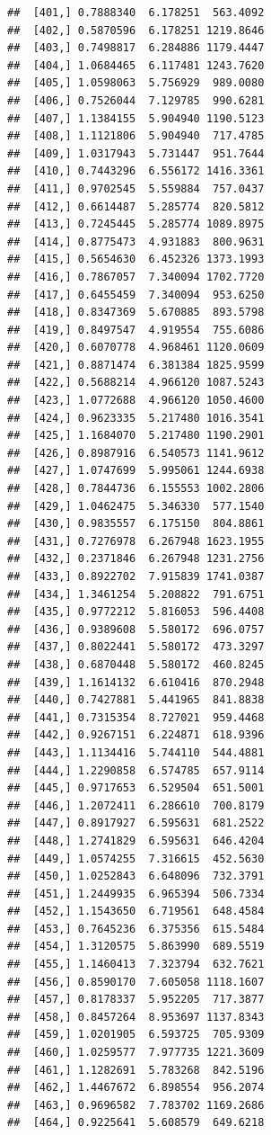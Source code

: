 \documentclass[article]{jss}\usepackage[]{graphicx}\usepackage[]{xcolor}
\makeatletter
\newenvironment{kframe}{%
 \def\at@end@of@kframe{}%
 \ifinner\ifhmode%
  \def\at@end@of@kframe{\end{minipage}}%
  \begin{minipage}{\columnwidth}%
 \fi\fi%
 \def\FrameCommand##1{\hskip\@totalleftmargin \hskip-\fboxsep
 \colorbox{shadecolor}{##1}\hskip-\fboxsep
     \hskip-\linewidth \hskip-\@totalleftmargin \hskip\columnwidth}%
 \MakeFramed {\advance\hsize-\width
   \@totalleftmargin\z@ \linewidth\hsize
   \@setminipage}}%
 {\par\unskip\endMakeFramed%
 \at@end@of@kframe}
\newenvironment{knitrout}{}{} %
\makeatother
\begin{document}
\begin{knitrout}
\begin{kframe}
\begin{verbatim}
##  [401,] 0.7888340  6.178251  563.4092
##  [402,] 0.5870596  6.178251 1219.8646
##  [403,] 0.7498817  6.284886 1179.4447
##  [404,] 1.0684465  6.117481 1243.7620
##  [405,] 1.0598063  5.756929  989.0080
##  [406,] 0.7526044  7.129785  990.6281
##  [407,] 1.1384155  5.904940 1190.5123
##  [408,] 1.1121806  5.904940  717.4785
##  [409,] 1.0317943  5.731447  951.7644
##  [410,] 0.7443296  6.556172 1416.3361
##  [411,] 0.9702545  5.559884  757.0437
##  [412,] 0.6614487  5.285774  820.5812
##  [413,] 0.7245445  5.285774 1089.8975
##  [414,] 0.8775473  4.931883  800.9631
##  [415,] 0.5654630  6.452326 1373.1993
##  [416,] 0.7867057  7.340094 1702.7720
##  [417,] 0.6455459  7.340094  953.6250
##  [418,] 0.8347369  5.670885  893.5798
##  [419,] 0.8497547  4.919554  755.6086
##  [420,] 0.6070778  4.968461 1120.0609
##  [421,] 0.8871474  6.381384 1825.9599
##  [422,] 0.5688214  4.966120 1087.5243
##  [423,] 1.0772688  4.966120 1050.4600
##  [424,] 0.9623335  5.217480 1016.3541
##  [425,] 1.1684070  5.217480 1190.2901
##  [426,] 0.8987916  6.540573 1141.9612
##  [427,] 1.0747699  5.995061 1244.6938
##  [428,] 0.7844736  6.155553 1002.2806
##  [429,] 1.0462475  5.346330  577.1540
##  [430,] 0.9835557  6.175150  804.8861
##  [431,] 0.7276978  6.267948 1623.1955
##  [432,] 0.2371846  6.267948 1231.2756
##  [433,] 0.8922702  7.915839 1741.0387
##  [434,] 1.3461254  5.208822  791.6751
##  [435,] 0.9772212  5.816053  596.4408
##  [436,] 0.9389608  5.580172  696.0757
##  [437,] 0.8022441  5.580172  473.3297
##  [438,] 0.6870448  5.580172  460.8245
##  [439,] 1.1614132  6.610416  870.2948
##  [440,] 0.7427881  5.441965  841.8838
##  [441,] 0.7315354  8.727021  959.4468
##  [442,] 0.9267151  6.224871  618.9396
##  [443,] 1.1134416  5.744110  544.4881
##  [444,] 1.2290858  6.574785  657.9114
##  [445,] 0.9717653  6.529504  651.5001
##  [446,] 1.2072411  6.286610  700.8179
##  [447,] 0.8917927  6.595631  681.2522
##  [448,] 1.2741829  6.595631  646.4204
##  [449,] 1.0574255  7.316615  452.5630
##  [450,] 1.0252843  6.648096  732.3791
##  [451,] 1.2449935  6.965394  506.7334
##  [452,] 1.1543650  6.719561  648.4584
##  [453,] 0.7645236  6.375356  615.5484
##  [454,] 1.3120575  5.863990  689.5519
##  [455,] 1.1460413  7.323794  632.7621
##  [456,] 0.8590170  7.605058 1118.1607
##  [457,] 0.8178337  5.952205  717.3877
##  [458,] 0.8457264  8.953697 1137.8343
##  [459,] 1.0201905  6.593725  705.9309
##  [460,] 1.0259577  7.977735 1221.3609
##  [461,] 1.1282691  5.783268  842.5196
##  [462,] 1.4467672  6.898554  956.2074
##  [463,] 0.9696582  7.783702 1169.2686
##  [464,] 0.9225641  5.608579  649.6218

\end{verbatim}
\end{kframe}
\end{knitrout}
\end{document}
